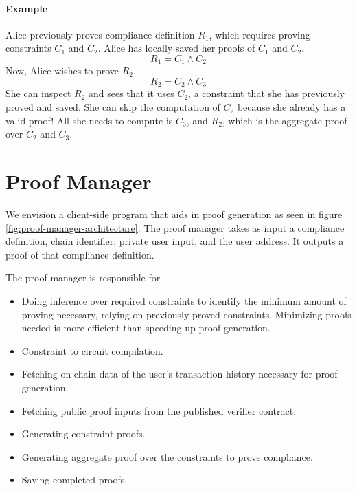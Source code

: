 \documentclass[9pt]{extreport}
\begin{document}
\paragraph{Example} 
Alice previously proves compliance definition $R_1$, which requires proving constraints $C_1$ and $C_2$.  Alice has locally saved her proofs of $C_1$ and $C_2$.
$$R_1 = C_1 \land C_2$$
Now, Alice wishes to prove $R_2$.  
$$R_2 = C_2 \land C_3$$
She can inspect $R_2$ and sees that it uses $C_2$, a constraint that she has previously proved and saved.  She can skip the computation of $C_2$ because she already has a valid proof!  All she needs to compute is $C_3$, and $R_2$, which is the aggregate proof over $C_2$ and $C_3$.

\section{Proof Manager}
\label{sec:proof-manager}
 We envision a client-side program that aids in proof generation as seen in figure \ref{fig:proof-manager-architecture}. The proof manager takes as input a compliance definition, chain identifier, private user input, and the user address.  It outputs a proof of that compliance definition.

The proof manager is responsible for
\begin{itemize}
    \item Doing inference over required constraints to identify the minimum amount of proving necessary, relying on previously proved constraints.  Minimizing proofs needed is more efficient than speeding up proof generation.
    \item Constraint to circuit compilation.
    \item Fetching on-chain data of the user's transaction history necessary for proof generation.
    \item Fetching public proof inputs from the published verifier contract.
    \item Generating constraint proofs.
    \item Generating aggregate proof over the constraints to prove compliance.
    \item Saving completed proofs.
\end{itemize}
\end{document}
